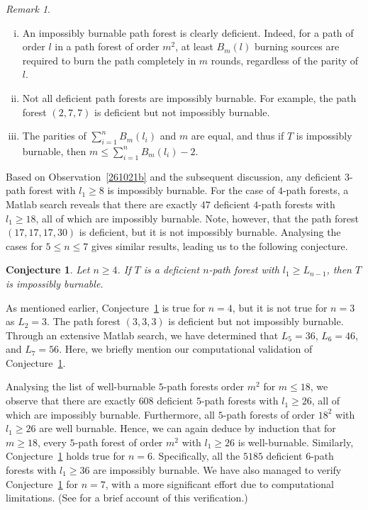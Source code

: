 \documentclass[
final
]{dmtcs-episciences}
\newtheorem{conjecture}[theorem]{Conjecture}
\theoremstyle{definition}
\theoremstyle{remark}
\newtheorem{remark}[theorem]{Remark}
\begin{document}
\begin{remark}\label{040222a}
	\begin{enumerate}[(i)]
		\item An impossibly burnable path forest is clearly deficient. Indeed, for a path of order $l$ in a path forest of order $m^2$, at least $B_m(l)$ burning sources are required to burn the path completely in $m$ rounds, regardless of the parity of $l$.
		\item Not all deficient path forests are impossibly burnable. For example, the path forest $(2,7,7)$ is deficient but not impossibly burnable.
		\item The parities of $\sum_{i=1}^n B_m(l_i)$ and $m$ are equal, and thus if $T$ is impossibly burnable, then $m \leq \sum_{i=1}^n B_m(l_i)-2$.
	\end{enumerate}
\end{remark}

Based on Observation~\ref{261021b} and the subsequent discussion, any deficient $3$-path forest with $l_1\ge 8$ is impossibly burnable.
For the case of $4$-path forests, a Matlab search reveals that there are exactly $47$ deficient $4$-path forests with $l_1\geq 18$, all of which are impossibly burnable.
Note, however, that the path forest $(17,17,17,30)$ is deficient, but it is not impossibly burnable.
Analysing the cases for $5\le n\le 7$ gives similar results, leading us to the following conjecture.

\begin{conjecture}\label{050522f}
	Let $n\geq 4$.
	If $T$ is a deficient $n$-path forest with $l_1\geq L_{n-1}$, then $T$ is impossibly burnable.
\end{conjecture}

As mentioned earlier, Conjecture~\ref{050522f} is true for $n=4$, but it is not true for $n=3$ as $L_2=3$. The path forest $(3,3,3)$ is deficient but not impossibly burnable. Through an extensive Matlab search, we have determined that $L_5=36$, $L_6=46$, and $L_7=56$. Here, we briefly mention our computational validation of Conjecture~\ref{050522f}.

Analysing the list of well-burnable $5$-path forests order $m^2$ for $m\le 18$, we observe that there are exactly $608$ deficient $5$-path forests with $l_1\ge 26$, all of which are impossibly burnable.
Furthermore, all $5$-path forests of order $18^2$ with $l_1\ge 26$ are well burnable.
Hence, we can again deduce by induction that for $m\ge 18$, every $5$-path forest of order $m^2$ with $l_1\ge 26$ is well-burnable.
Similarly, Conjecture~\ref{050522f} holds true for $n=6$.
Specifically, all the $5185$ deficient $6$-path forests with $l_1\ge 36$ are impossibly burnable.
We have also managed to verify Conjecture~\ref{050522f} for $n=7$, with a more significant effort due to computational limitations.
(See  for a brief account of this verification.)
\end{document}
